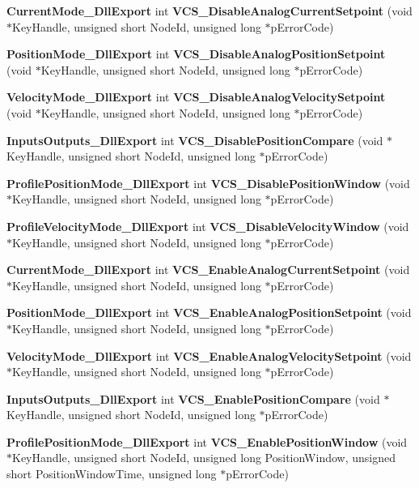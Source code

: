 \begin{DoxyCompactItemize}
\item 
{\bf \-Current\-Mode\-\_\-\-Dll\-Export} int {\bf \-V\-C\-S\-\_\-\-Disable\-Analog\-Current\-Setpoint} (void $\ast$\-Key\-Handle, unsigned short \-Node\-Id, unsigned long $\ast$p\-Error\-Code)
\item 
{\bf \-Position\-Mode\-\_\-\-Dll\-Export} int {\bf \-V\-C\-S\-\_\-\-Disable\-Analog\-Position\-Setpoint} (void $\ast$\-Key\-Handle, unsigned short \-Node\-Id, unsigned long $\ast$p\-Error\-Code)
\item 
{\bf \-Velocity\-Mode\-\_\-\-Dll\-Export} int {\bf \-V\-C\-S\-\_\-\-Disable\-Analog\-Velocity\-Setpoint} (void $\ast$\-Key\-Handle, unsigned short \-Node\-Id, unsigned long $\ast$p\-Error\-Code)
\item 
{\bf \-Inputs\-Outputs\-\_\-\-Dll\-Export} int {\bf \-V\-C\-S\-\_\-\-Disable\-Position\-Compare} (void $\ast$\-Key\-Handle, unsigned short \-Node\-Id, unsigned long $\ast$p\-Error\-Code)
\item 
{\bf \-Profile\-Position\-Mode\-\_\-\-Dll\-Export} int {\bf \-V\-C\-S\-\_\-\-Disable\-Position\-Window} (void $\ast$\-Key\-Handle, unsigned short \-Node\-Id, unsigned long $\ast$p\-Error\-Code)
\item 
{\bf \-Profile\-Velocity\-Mode\-\_\-\-Dll\-Export} int {\bf \-V\-C\-S\-\_\-\-Disable\-Velocity\-Window} (void $\ast$\-Key\-Handle, unsigned short \-Node\-Id, unsigned long $\ast$p\-Error\-Code)
\item 
{\bf \-Current\-Mode\-\_\-\-Dll\-Export} int {\bf \-V\-C\-S\-\_\-\-Enable\-Analog\-Current\-Setpoint} (void $\ast$\-Key\-Handle, unsigned short \-Node\-Id, unsigned long $\ast$p\-Error\-Code)
\item 
{\bf \-Position\-Mode\-\_\-\-Dll\-Export} int {\bf \-V\-C\-S\-\_\-\-Enable\-Analog\-Position\-Setpoint} (void $\ast$\-Key\-Handle, unsigned short \-Node\-Id, unsigned long $\ast$p\-Error\-Code)
\item 
{\bf \-Velocity\-Mode\-\_\-\-Dll\-Export} int {\bf \-V\-C\-S\-\_\-\-Enable\-Analog\-Velocity\-Setpoint} (void $\ast$\-Key\-Handle, unsigned short \-Node\-Id, unsigned long $\ast$p\-Error\-Code)
\item 
{\bf \-Inputs\-Outputs\-\_\-\-Dll\-Export} int {\bf \-V\-C\-S\-\_\-\-Enable\-Position\-Compare} (void $\ast$\-Key\-Handle, unsigned short \-Node\-Id, unsigned long $\ast$p\-Error\-Code)
\item 
{\bf \-Profile\-Position\-Mode\-\_\-\-Dll\-Export} int {\bf \-V\-C\-S\-\_\-\-Enable\-Position\-Window} (void $\ast$\-Key\-Handle, unsigned short \-Node\-Id, unsigned long \-Position\-Window, unsigned short \-Position\-Window\-Time, unsigned long $\ast$p\-Error\-Code)

\end{DoxyCompactItemize}
